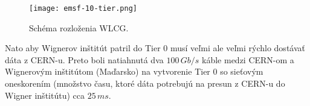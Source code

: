 \documentclass[../../main.tex]{subfiles}
\begin{document}
\begin{figure}[h!]
\texttt{[image: emsf-10-tier.png]}
\centering
\caption{Schéma rozloženia WLCG.}
\label{em10:fig:tier}
\end{figure}

Nato aby Wignerov inštitút patril do Tier 0 musí veľmi ale veľmi rýchlo dostávať dáta z CERN-u. Preto boli natiahnutá dva $100\,Gb/s$ káble medzi CERN-om a Wignerovým inštitútom (Maďarsko) na vytvorenie Tier 0 so sieťovým oneskorením (množstvo času, ktoré dáta potrebujú na presun z CERN-u do Wigner inštitútu) cca $25\,ms$.
\end{document}
